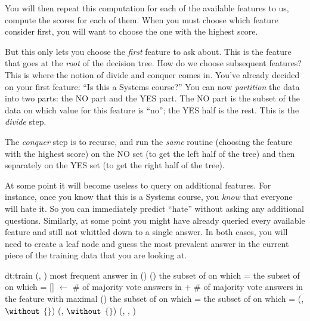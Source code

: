 
You will then repeat this computation for each of the available
features to us, compute the scores for each of them.  When you must
choose which feature consider first, you will want to choose the one
with the highest score.

But this only lets you choose the \emph{first} feature to ask about.
This is the feature that goes at the \emph{root} of the decision tree.
How do we choose subsequent features?  This is where the notion of
divide and conquer comes in.  You've already decided on your first
feature: ``Is this a Systems course?''  You can now \emph{partition}
the data into two parts: the NO part and the YES part.  The NO part is
the subset of the data on which value for this feature is ``no''; the
YES half is the rest.  This is the \emph{divide} step.

The \emph{conquer} step is to recurse, and run the \emph{same}
routine (choosing the feature with the highest score) on the NO set
(to get the left half of the tree) and then separately on the YES set
(to get the right half of the tree).

At some point it will become useless to query on additional features.
For instance, once you know that this is a Systems course, you
\emph{know} that everyone will hate it.  So you can immediately
predict ``hate'' without asking any additional questions.  Similarly,
at some point you might have already queried every available feature
and still not whittled down to a single answer.  In both cases, you
will need to create a leaf node and guess the most prevalent answer in
the current piece of the training data that you are looking at.


\newalgorithm%
  {dt:train}%
  {(, )}%
  {
 most frequent answer in  
\RETURN {}() 
\RETURN {}() 
 the subset of  on which =
 the subset of  on which =
\STATE {}[] $\leftarrow$ \# of majority vote answers in 
\STATE \quad\quad\quad\quad + \# of majority vote answers in \\
\ENDFOR
{} the feature with maximal ()
 the subset of  on which =
 the subset of  on which =
 (,  $\without$ $\{$$\}$)
 (,  $\without$ $\{$$\}$)
\RETURN {}(, , )
\ENDIF
}

